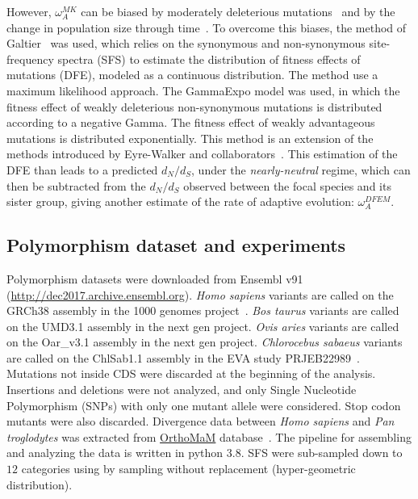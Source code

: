 \documentclass{article}
\begin{document}
However, $\omega_A^{MK}$ can be biased by moderately deleterious mutations~\citep{eyre-walker_quantifying_2002} and by the change in population size through time~\citep{eyre-walker_changing_2002}.
To overcome this biases, the method of Galtier~\citep{Galtier2016} was used, which relies on the synonymous and non-synonymous site-frequency spectra (SFS) to estimate the distribution of fitness effects of mutations (DFE), modeled as a continuous distribution.
The method use a maximum likelihood approach.
The GammaExpo model was used, in which the fitness effect of weakly deleterious non-synonymous mutations is distributed according to a negative Gamma.
The fitness effect of weakly advantageous mutations is distributed exponentially.
This method is an extension of the methods introduced by Eyre-Walker and collaborators~\citep{eyre-walker_distribution_2006, eyre-walker_estimating_2009}.
This estimation of the DFE than leads to a predicted $d_N/d_S$, under the \textit{nearly-neutral} regime, which can then be subtracted from the $d_N/d_S$ observed between the focal species and its sister group, giving another estimate of the rate of adaptive evolution: $\omega_A^{DFEM}$.

\subsection*{Polymorphism dataset and experiments}

Polymorphism datasets were downloaded from Ensembl v91 (\url{http://dec2017.archive.ensembl.org}).
\textit{Homo sapiens} variants are called on the GRCh38 assembly in the 1000 genomes project~\citep{consortium_integrated_2012, the_1000_genomes_project_consortium_global_2015}.
\textit{Bos taurus} variants are called on the UMD3.1 assembly in the next gen project.
\textit{Ovis aries} variants are called on the Oar\_v3.1 assembly in the next gen project.
\textit{Chlorocebus sabaeus} variants are called on the ChlSab1.1 assembly in the EVA study PRJEB22989~\citep{svardal2017}.
Mutations not inside CDS were discarded at the beginning of the analysis.
Insertions and deletions were not analyzed, and only Single Nucleotide Polymorphism (SNPs) with only one mutant allele were considered.
Stop codon mutants were also discarded.
Divergence data between \textit{Homo sapiens} and \textit{Pan troglodytes} was extracted from \href{http://www.orthomam.univ-montp2.fr}{OrthoMaM} database~\citep{Ranwez2007, Douzery2014, Scornavacca2019}.
The pipeline for assembling and analyzing the data is written in python 3.8.
SFS were sub-sampled down to $12$ categories using by sampling without replacement (hyper-geometric distribution).
\end{document}

